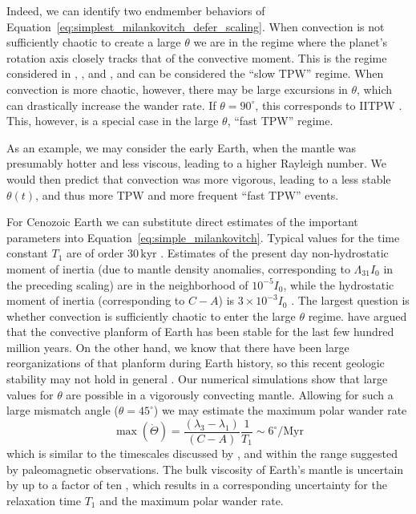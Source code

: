 \documentclass[extra,mreferee]{gji}
\begin{document}
Indeed, we can identify two endmember behaviors of Equation~\eqref{eq:simplest_milankovitch_defer_scaling}.
When convection is not sufficiently chaotic to create a large $\theta$ we are in the regime where the planet's rotation axis closely tracks that of the convective moment.
This is the regime considered in \citet{steinberger1997changes}, \citet{roberts2007cause}, and \citet{zhong2007supercontinent}, and can be considered the ``slow TPW'' regime.
When convection is more chaotic, however, there may be large excursions in $\theta$, which can drastically increase the wander rate.  
If $\theta=90^\circ$, this corresponds to IITPW \citep{kirschvink1997evidence}.  
This, however, is a special case in the large $\theta$, ``fast TPW'' regime.

As an example, we may consider the early Earth, when the mantle was presumably hotter and less viscous, leading to a 
higher Rayleigh number. We would then predict that convection was more vigorous, leading to 
a less stable $\theta(t)$, and thus more TPW and more frequent ``fast TPW'' events.

For Cenozoic Earth we can substitute direct estimates of the important parameters into Equation~\eqref{eq:simple_milankovitch}.
Typical values for the time constant $T_1$ are of order $30 \, \mathrm{kyr}$ \citep{ricard1993polar}.
Estimates of the present day non-hydrostatic moment of inertia (due to mantle density anomalies, corresponding to $\Lambda_{31}I_0$ in the preceding scaling)
are in the neighborhood of $10^{-5} I_0$, while the hydrostatic moment of inertia (corresponding to $C-A$) is $3 \times 10^{-3} I_0$ \citep{chambat2001mean}.
The largest question is whether convection is sufficiently chaotic to enter the large $\theta$ regime. 
\citet{richards1997explanation} have argued that the convective planform of Earth has been stable for the last
few hundred million years. On the other hand, we know that there have been large reorganizations of that planform 
during Earth history, so this recent geologic stability may not hold in general \citep{evans2003true}.
Our numerical simulations show that large values for $\theta$ are possible in a vigorously convecting mantle.
Allowing for such a large mismatch angle ($\theta = 45^\circ$) we may estimate the maximum polar wander rate
\begin{equation}
\max ( \dot{\Theta} ) = \frac{(\lambda_3-\lambda_1)}{(C-A)}\frac{1}{T_1} \sim 6^\circ / \mathrm{Myr}
\end{equation}
which is similar to the timescales discussed by \citet{cambiotti2011new}, and within the range 
suggested by paleomagnetic observations.
The bulk viscosity of Earth's mantle is uncertain by up to a factor of ten \citep{mitrovica2004new},
which results in a corresponding uncertainty for the relaxation time $T_1$ and the maximum polar wander rate.
\end{document}
